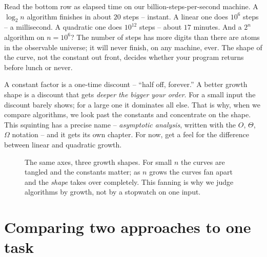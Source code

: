 Read the bottom row as elapsed time on our billion-steps-per-second machine. A
$\log_2 n$ algorithm finishes in about $20$ steps -- instant. A linear one does
$10^6$ steps -- a millisecond. A quadratic one does $10^{12}$ steps -- about
$17$ minutes. And a $2^n$ algorithm on $n = 10^6$? The number of steps has more
digits than there are atoms in the observable universe; it will never finish, on any
machine, ever. The shape of the curve, not the constant out front, decides whether
your program returns before lunch or never.

\begin{intuitionbox}
A constant factor is a one-time discount -- ``half off, forever.'' A better growth
shape is a discount that gets \emph{deeper the bigger your order}. For a small input
the discount barely shows; for a large one it dominates all else. That is why, when
we compare algorithms, we look past the constants and concentrate on the shape.
This squinting has a precise name -- \emph{asymptotic analysis}, written with the
$O$, $\Theta$, $\Omega$ notation -- and it gets its own chapter. For now, get a feel
for the difference between linear and quadratic growth.
\end{intuitionbox}

\begin{figure}[H]
\centering
{}
\caption{The same axes, three growth shapes. For small $n$ the curves are tangled
and the constants matter; as $n$ grows the curves fan apart and the \emph{shape}
takes over completely. This fanning is why we judge algorithms by growth, not by a
stopwatch on one input.}
\label{ch01:growth-shapes}
\end{figure}

\section{Comparing two approaches to one task}

